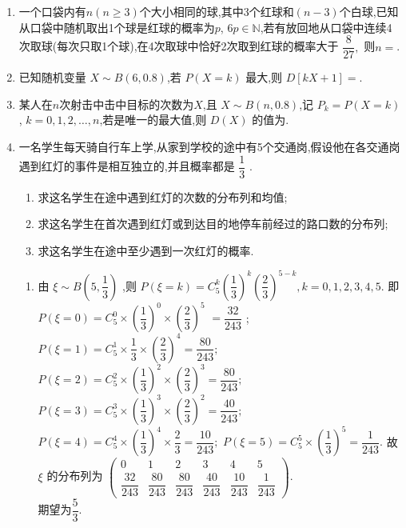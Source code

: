 \begin{enumerate}
\item 一个口袋内有$n(n\ge 3)$个大小相同的球,其中3个红球和$(n-3)$个白球,已知从口袋中随机取出1个球是红球的概率为$p$, $6p\in \mathbb{N}$,若有放回地从口袋中连续4次取球(每次只取1个球),在4次取球中恰好2次取到红球的概率大于 $\dfrac{8}{27},$ 则$n=$.

\item 已知随机变量 $X\sim B(6,0.8)$,若 $P(X=k)$ 最大,则 $D[kX+1]=$.

\item 某人在$n$次射击中击中目标的次数为$X$,且 $X\sim B(n,0.8)$,记 $P_{k}=P(X=k)$, $k=0,1,2,\dots,n$,若是唯一的最大值,则 $D(X)$ 的值为.

\item 一名学生每天骑自行车上学,从家到学校的途中有5个交通岗,假设他在各交通岗遇到红灯的事件是相互独立的,并且概率都是 $\dfrac{1}{3}$ .
\begin{enumerate}
\item 求这名学生在途中遇到红灯的次数的分布列和均值;
\item 求这名学生在首次遇到红灯或到达目的地停车前经过的路口数的分布列;
\item 求这名学生在途中至少遇到一次红灯的概率.
\end{enumerate}
\begin{jieda}
    \begin{enumerate}
        \item 由 $\xi  \sim  B\left( {5,\dfrac{1}{3}}\right)$ ,则
$P\left( {\xi  = k}\right)  = {{C}}_{5}^{k}{\left( \dfrac{1}{3}\right) }^{k}{\left( \dfrac{2}{3}\right) }^{5 - k},k = 0,1,2,3,4,5.$
即 $P\left( {\xi  = 0}\right)  = {{C}}_{5}^{0} \times  {\left( \dfrac{1}{3}\right) }^{0} \times  {\left( \dfrac{2}{3}\right) }^{5}$
$= \dfrac{32}{243}$ ;
$P\left( {\xi  = 1}\right)  = {{C}}_{5}^{1} \times  \dfrac{1}{3} \times  {\left( \dfrac{2}{3}\right) }^{4} = \dfrac{80}{243};$
$P\left( {\xi  = 2}\right)  = {{C}}_{5}^{2} \times  {\left( \dfrac{1}{3}\right) }^{2} \times  {\left( \dfrac{2}{3}\right) }^{3} = \dfrac{80}{243};$
$P\left( {\xi  = 3}\right)  = {{C}}_{5}^{3} \times  {\left( \dfrac{1}{3}\right) }^{3} \times  {\left( \dfrac{2}{3}\right) }^{2} = \dfrac{40}{243};$
$P\left( {\xi  = 4}\right)  = {{C}}_{5}^{4} \times  {\left( \dfrac{1}{3}\right) }^{4} \times  \dfrac{2}{3} = \dfrac{10}{243};$
$P\left( {\xi  = 5}\right)  = {{C}}_{5}^{5} \times  {\left( \dfrac{1}{3}\right) }^{5} = \dfrac{1}{243}.$
故 $\xi$ 的分布列为
$\begin{pmatrix}
 0& 1& 2 &3& 4& 5\\
\dfrac{32}{243}&\dfrac{80}{243}&\dfrac{80}{243}&\dfrac{40}{243}&\dfrac{10}{243}&\dfrac{1}{243}
\end{pmatrix}$.\\
期望为$\dfrac{5}{3}$.


\end{enumerate}
\end{jieda}
\end{enumerate}
